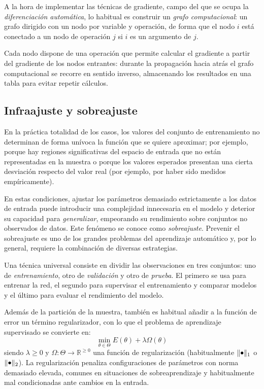 A la hora de implementar las técnicas de gradiente, campo del que se ocupa la \textit{diferenciación automática}, lo habitual es construir un \textit{grafo computacional}: un grafo dirigido con un nodo por variable y operación, de forma que el nodo \( i \) está conectado a un nodo de operación \( j \) si \( i \) es un argumento de \( j \). 

Cada nodo dispone de una operación que permite calcular el gradiente a partir del gradiente de los nodos entrantes: durante la propagación hacia atrás el grafo computacional se recorre en sentido inverso, almacenando los resultados en una tabla para evitar repetir cálculos.

\subsection{Infraajuste y sobreajuste}
En la práctica totalidad de los casos, los valores del conjunto de entrenamiento no determinan de forma unívoca la función que se quiere aproximar; por ejemplo, porque hay regiones significativas del espacio de entrada que no están representadas en la muestra o porque los valores esperados presentan una cierta desviación respecto del valor real (por ejemplo, por haber sido medidos empíricamente).

En estas condiciones, ajustar los parámetros demasiado estrictamente a los datos de entrada puede introducir una complejidad innecesaria en el modelo y deterior su capacidad para \textit{generalizar}, empeorando su rendimiento sobre conjuntos no observados de datos. Este fenómeno se conoce como \textit{sobreajuste}. Prevenir el sobreajuste es uno de los grandes problemas del aprendizaje automático y, por lo general, requiere la combinación de diversas estrategias.

Una técnica universal consiste en dividir las observaciones en tres conjuntos: uno de \textit{entrenamiento}, otro de \textit{validación} y otro de \textit{prueba}. El primero se usa para entrenar la red, el segundo para supervisar el entrenamiento y comparar modelos y el último para evaluar el rendimiento del modelo.

Además de la partición de la muestra, también es habitual añadir a la función de error un término regularizador, con lo que el problema de aprendizaje supervisado se convierte en:
\[
    \min_{\theta \in \Theta} E(\theta) + \lambda \Omega(\theta)
\]
siendo \( \lambda \geq 0 \) y \( \Omega \colon \Theta \to \mathbb{R}^{\geq 0} \)  una función de regularización (habitualmente \( \| \smallbullet \|_{1} \) o \( \| \smallbullet \|_{2} \)). La regularización penaliza configuraciones de parámetros con norma demasiado elevada, comunes en situaciones de sobreaprendizaje y habitualmente mal condicionadas ante cambios en la entrada.

